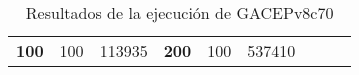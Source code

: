 \begin{table}[H]
\begin{tabular}{|ccrccrccc}
\multicolumn{1}{|c|}{\multirow{-39}{*}{\cellcolor[HTML]{FFFFC7}\textbf{100}}} & \multicolumn{1}{c|}{\multirow{-9}{*}{\cellcolor[HTML]{DDFDFF}100}} & \multicolumn{1}{r|}{\cellcolor[HTML]{DAE8FC}113935}    & \multicolumn{1}{c|}{\multirow{-39}{*}{\cellcolor[HTML]{FFFFC7}\textbf{200}}} & \multicolumn{1}{c|}{\multirow{-10}{*}{\cellcolor[HTML]{DDFDFF}100}} & \multicolumn{1}{r|}{\cellcolor[HTML]{DDFDFF}537410}    &                                                                              &                                                                    &                                                        \\ \cline{1-6}
\end{tabular}
\caption{\label{res:GACEPv8c70}Resultados de la ejecución de GACEPv8c70}
\end{table}

